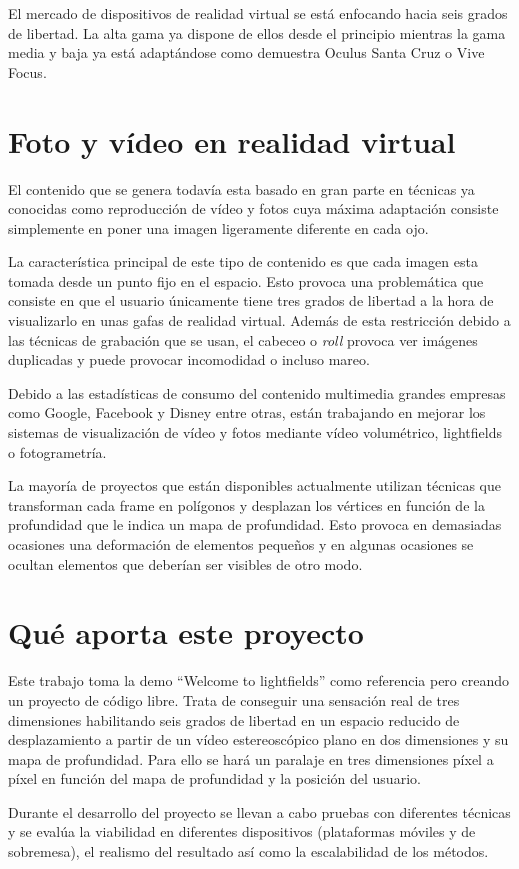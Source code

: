El mercado de dispositivos de realidad virtual se está enfocando hacia seis grados de libertad. La alta gama ya dispone de ellos desde el principio mientras la gama media y baja ya está adaptándose como demuestra Oculus Santa Cruz o Vive Focus.

\section{Foto y vídeo en realidad virtual}
El contenido que se genera todavía esta basado en gran parte en técnicas ya conocidas como reproducción de vídeo y fotos cuya máxima adaptación consiste simplemente en poner una imagen ligeramente diferente en cada ojo.

La característica principal de este tipo de contenido es que cada imagen esta tomada desde un punto fijo en el espacio. Esto provoca una problemática que consiste en que el usuario únicamente tiene tres grados de libertad a la hora de visualizarlo en unas gafas de realidad virtual. Además de esta restricción debido a las técnicas de grabación que se usan, el cabeceo o \textit{roll} provoca ver imágenes duplicadas y puede provocar incomodidad o incluso mareo.

Debido a las estadísticas de consumo del contenido multimedia grandes empresas como Google, Facebook y Disney entre otras, están trabajando en mejorar los sistemas de visualización de vídeo y fotos mediante vídeo volumétrico, lightfields o fotogrametría.

La mayoría de proyectos que están disponibles actualmente utilizan técnicas que transforman cada frame en polígonos y desplazan los vértices en función de la profundidad que le indica un mapa de profundidad. Esto provoca en demasiadas ocasiones una deformación de elementos pequeños y en algunas ocasiones se ocultan elementos que deberían ser visibles de otro modo.

\section{Qué aporta este proyecto}
Este trabajo toma la demo ``Welcome to lightfields'' como referencia pero creando un proyecto de código libre. Trata de conseguir una sensación real de tres dimensiones habilitando seis grados de libertad en un espacio reducido de desplazamiento a partir de un vídeo estereoscópico plano en dos dimensiones y su mapa de profundidad. Para ello se hará un paralaje en tres dimensiones píxel a píxel en función del mapa de profundidad y la posición del usuario.

Durante el desarrollo del proyecto se llevan a cabo pruebas con diferentes técnicas y se evalúa la viabilidad en diferentes dispositivos (plataformas móviles y de sobremesa), el realismo del resultado así como la escalabilidad de los métodos.

















